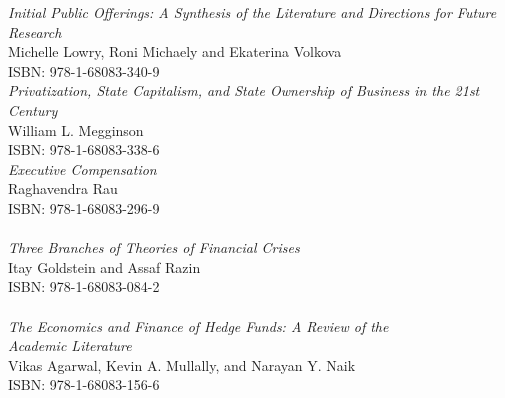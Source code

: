 \vspace{12pt}

\noindent \textit{Initial Public Offerings: A Synthesis of the Literature and Directions for Future Research}\\
Michelle Lowry, Roni Michaely and Ekaterina Volkova\\
ISBN: 978-1-68083-340-9\\

\noindent \textit{Privatization, State Capitalism, and State Ownership of Business in the 21st Century}\\
William L. Megginson\\
ISBN: 978-1-68083-338-6\\

\noindent \textit{Executive Compensation}\\
Raghavendra Rau\\
ISBN: 978-1-68083-296-9\\
\\
\noindent \textit{Three Branches of Theories of Financial Crises}\\
Itay Goldstein and Assaf Razin\\
ISBN: 978-1-68083-084-2\\
\\
\noindent \textit{The Economics and Finance of Hedge Funds: A Review of the\\ Academic Literature}\\
Vikas Agarwal, Kevin A. Mullally, and Narayan Y. Naik\\
ISBN: 978-1-68083-156-6\\